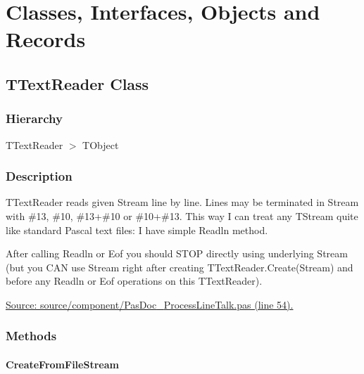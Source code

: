 \documentclass{report}
\newif\ifpdf
\begin{document}
\section{Classes, Interfaces, Objects and Records}
\ifpdf
\subsection*{\large{\textbf{TTextReader Class}}\normalsize\hspace{1ex}\hrulefill}
\else
\subsection*{TTextReader Class}
\fi
\label{PasDoc_ProcessLineTalk.TTextReader}
\subsubsection*{\large{\textbf{Hierarchy}}\normalsize\hspace{1ex}\hfill}
TTextReader {$>$} TObject
\subsubsection*{\large{\textbf{Description}}\normalsize\hspace{1ex}\hfill}
TTextReader reads given Stream line by line. Lines may be terminated in Stream with {\#}13, {\#}10, {\#}13+{\#}10 or {\#}10+{\#}13. This way I can treat any TStream quite like standard Pascal text files: I have simple Readln method.

After calling Readln or Eof you should STOP directly using underlying Stream (but you CAN use Stream right after creating TTextReader.Create(Stream) and before any Readln or Eof operations on this TTextReader).\par
\href{https://github.com/pasdoc/pasdoc/blob/master/source/component/PasDoc_ProcessLineTalk.pas#L54}{Source: source/component/PasDoc{\_}ProcessLineTalk.pas (line 54).}\subsubsection*{\large{\textbf{Methods}}\normalsize\hspace{1ex}\hfill}
\paragraph*{CreateFromFileStream}\hspace*{\fill}
\end{document}
